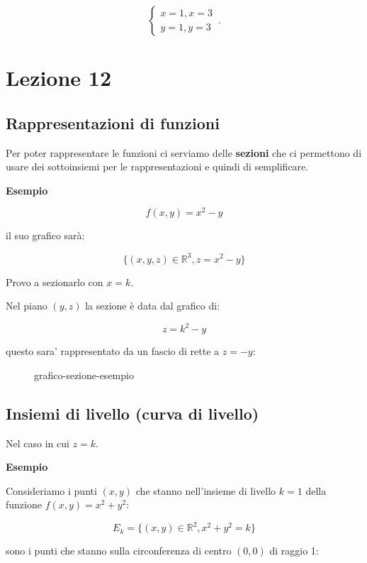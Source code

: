 \documentclass[11pt]{article}
\begin{document}
\begin{equation}
    \begin{cases}
           x=1,x=3\\
           y=1,y=3
    \end{cases}\,.
\end{equation}

\section{Lezione 12}

\subsection{Rappresentazioni di funzioni}

Per poter rappresentare le funzioni ci serviamo delle \textbf{sezioni} che ci permettono di usare dei sottoinsiemi per le rappresentazioni e quindi di semplificare.

\textbf{Esempio} 

\[
    f(x,y)=x^{2}-y
\]

il suo grafico sarà:

\[
    \{(x,y,z) \in \mathbb{R}^{3},z=x^{2}-y\}
\]

Provo a sezionarlo con $x=k$.

Nel piano $(y,z)$ la sezione è data dal grafico di:

\[
    z= k^{2}-y
\]

questo sara' rappresentato da un fascio di rette a $z=-y$:

\begin{figure}[ht]
    \centering
    \caption{grafico-sezione-esempio}
    \label{fig:grafico-sezione-esempio}
\end{figure}


\subsection{Insiemi di livello (curva di livello)}

Nel caso in cui $z=k$.

\textbf{Esempio} 

Consideriamo i punti $(x,y)$ che stanno nell'insieme di livello $k=1$ della funzione $f(x,y)=x^{2}+y^{2}$:

\[
    E_k = \{(x,y) \in \mathbb{R}^{2},x^{2}+y^{2}=k\}
\]

sono i punti che stanno sulla circonferenza di centro $(0,0)$ di raggio 1:
\end{document}
